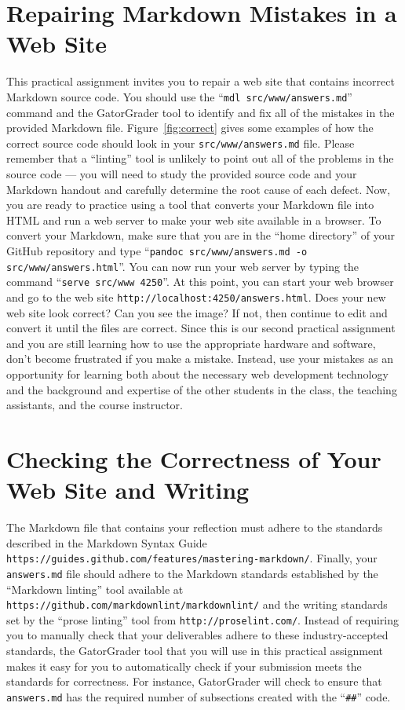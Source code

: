 \documentclass[11pt]{article}
\newcommand{\mainprogram}{\lstinline{answers.md}}
\newcommand{\mainprogramsource}{\lstinline{src/www/answers.md}}
\newcommand{\command}[1]{``\lstinline{#1}''}
\newcommand{\url}[1]{\lstinline{#1}}
\newcommand{\step}[1]{``{#1}''}
\begin{document}
\section*{Repairing Markdown Mistakes in a Web Site}

This practical assignment invites you to repair a web site that contains
incorrect Markdown source code. You should use the \command{mdl
src/www/answers.md} command and the GatorGrader tool to identify and fix all of
the mistakes in the provided Markdown file. Figure~\ref{fig:correct} gives some
examples of how the correct source code should look in your \mainprogramsource{}
file. Please remember that a ``linting'' tool is unlikely to point out all of
the problems in the source code --- you will need to study the provided source
code and your Markdown handout and carefully determine the root cause of each
defect. Now, you are ready to practice using a tool that converts your Markdown
file into HTML and run a web server to make your web site available in a
browser. To convert your Markdown, make sure that you are in the ``home
directory'' of your GitHub repository and type \command{pandoc
src/www/answers.md -o src/www/answers.html}. You can now run your web server by
typing the command \command{serve src/www 4250}. At this point, you can start
your web browser and go to the web site
\url{http://localhost:4250/answers.html}. Does your new web site look correct?
Can you see the image? If not, then continue to edit and convert it until the
files are correct. Since this is our second practical assignment and you are
still learning how to use the appropriate hardware and software, don't become
frustrated if you make a mistake. Instead, use your mistakes as an opportunity
for learning both about the necessary web development technology and the
background and expertise of the other students in the class, the teaching
assistants, and the course instructor.

\section*{Checking the Correctness of Your Web Site and Writing}

The Markdown file that contains your reflection must adhere to the standards
described in the Markdown Syntax Guide
\url{https://guides.github.com/features/mastering-markdown/}. Finally, your
\mainprogram{} file should adhere to the Markdown standards established by the
\step{Markdown linting} tool available at
\url{https://github.com/markdownlint/markdownlint/} and the writing standards
set by the \step{prose linting} tool from \url{http://proselint.com/}. Instead
of requiring you to manually check that your deliverables adhere to these
industry-accepted standards, the GatorGrader tool that you will use in this
practical assignment makes it easy for you to automatically check if your
submission meets the standards for correctness. For instance, GatorGrader will
check to ensure that \mainprogram{} has the required number of subsections
created with the \command{##} code.
\end{document}
